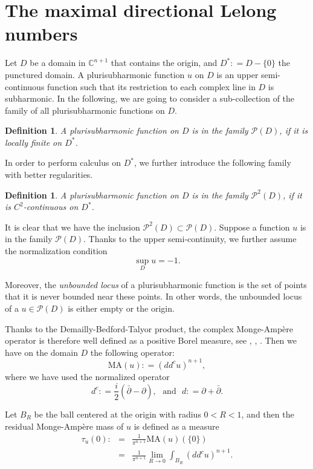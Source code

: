 \documentclass[a4paper,11pt]{amsart}
\numberwithin{equation}{section}
\newtheorem{defn}[theorem]{Definition}
\def\dbar{\bar\partial}
\def\d{\partial}
\def\cP{{\mathcal P}}
\def\cP{{\mathcal P}}
\def\bC{{\mathbb C}}
\begin{document}
\bigskip

\section{The maximal directional Lelong numbers}
\smallskip

Let $D$ be a domain in $\bC^{n+1}$ that contains the origin, 
and $D^*: = D -\{0 \}$ the punctured domain.
A plurisubharmonic function $u$ on $D$ 
is an upper semi-continuous function such that its restriction to each 
complex line in $D$ is subharmonic. 
In the following, 
we are going to consider a sub-collection of the family of all plurisubharmonic functions on $D$. 



\begin{defn}
\label{def-pre-001}
A plurisubharmonic function on $D$ is in the family $\cP(D)$, if it is locally finite on $D^*$.
\end{defn}

In order to perform calculus on $D^*$, 
we further introduce the following family with better regularities.  



\begin{defn}
\label{def-pre-002}
A plurisubharmonic function on $D$ is in the family $\cP^{2}(D)$, if it is $C^2$-continuous on $D^*$.
\end{defn}


It is clear that we have the inclusion $\cP^{2}(D)\subset \cP(D)$. 
Suppose a function $u$ is in the family $\cP(D)$.
Thanks to the upper semi-continuity, 
we further assume the normalization condition 
$$\sup_D u = -1.$$

Moreover, 
the \emph{unbounded locus} of a plurisubharmonic function
is the set of points that it is never bounded near these points. 
In other words, 
the unbounded locus of 
a $u\in\cP(D)$ is either empty or the origin. 


Thanks to the Demailly-Bedford-Talyor product,   
the complex Monge-Amp\`ere operator 
is therefore well defined as a positive Borel measure, 
see \cite{BT0}, \cite{BT}, \cite{Dem93}. 
Then we have on the domain $D$ the following operator: 
$$ \mbox{MA}(u): = (dd^c u)^{n+1}, $$  
where we have used the normalized operator 
\begin{equation}
 d^c: = \frac{i}{2} (\dbar - \d), \ \ \ \mbox{and} \ \ \ d: = \d + \dbar. 
\end{equation}

Let $B_R$ be the ball centered at the origin with radius $0<R<1$, 
and then the residual Monge-Amp\`ere mass of $u$ is defined as a measure
\begin{eqnarray}
\label{pre-000}
\tau_u(0): &=& \frac{1}{ \pi^{n+1}} \mbox{MA}(u) (\{ 0\})
\nonumber\\
&=&  \frac{1}{\pi^{n+1}}  \lim_{R\rightarrow 0} \int_{B_R} (dd^c u)^{n+1}.
\end{eqnarray}
\end{document}
